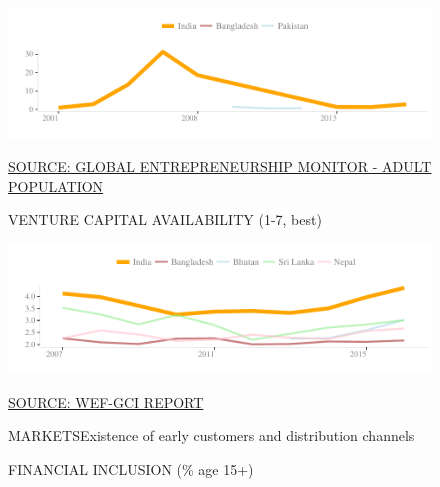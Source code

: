 \documentclass{article}\usepackage[]{graphicx}\usepackage[]{color}
\makeatletter
\def\maxwidth{ %
  \ifdim\Gin@nat@width>\linewidth
    \linewidth
  \else
    \Gin@nat@width
  \fi
}
\makeatother
\begin{document}
\begin{figure}
\begin{minipage}[c]{0.95\textwidth}
\begin{minipage}[c]{0.95\textwidth}
\begin{minipage}[c]{0.49\textwidth}
{\centering \includegraphics[width=\maxwidth]{figure/line_chart_Finance1-1} 

}



      \vspace*{-0.2cm} 
      \scriptsize{\href{NA}{\textcolor[HTML]{22A6F5}{SOURCE: GLOBAL ENTREPRENEURSHIP MONITOR - ADULT POPULATION}}}
    \end{minipage}
    \begin{minipage}[c]{0.49\textwidth} %
      \small{\textcolor[HTML]{818181}{VENTURE CAPITAL AVAILABILITY (1-7, best)}}


{\centering \includegraphics[width=\maxwidth]{figure/line_chart_Finance2-1} 

}



      \vspace*{-0.2cm} 
      \scriptsize{\href{NA}{\textcolor[HTML]{22A6F5}{SOURCE: WEF-GCI REPORT}}}
    \end{minipage}
  \end{minipage}  
  
  \vspace{5ex}
  \begin{minipage}[b]{0.95\textwidth}
    \begin{flushleft}  
      \Large{\textcolor[HTML]{22A6F5}{MARKETS}}\hspace{2ex}\small{\textcolor[HTML]{818181} {Existence of early customers and distribution channels}}
    \end{flushleft}
    \begin{minipage}[c]{0.48\textwidth} %
      \small{\textcolor[HTML]{818181}{FINANCIAL INCLUSION (\% age 15+)}}



\end{minipage}
\end{minipage}
\end{minipage}
\end{figure}
\end{document}
